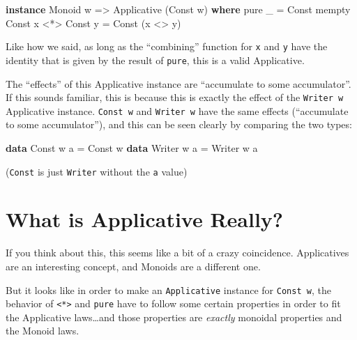 \documentclass[]{article}
\newenvironment{Shaded}{}{}
\newcommand{\DataTypeTok}[1]{\textcolor[rgb]{0.56,0.13,0.00}{#1}}
\newcommand{\FunctionTok}[1]{\textcolor[rgb]{0.02,0.16,0.49}{#1}}
\newcommand{\KeywordTok}[1]{\textcolor[rgb]{0.00,0.44,0.13}{\textbf{#1}}}
\newcommand{\NormalTok}[1]{#1}
\newcommand{\OperatorTok}[1]{\textcolor[rgb]{0.40,0.40,0.40}{#1}}
\newcommand{\OtherTok}[1]{\textcolor[rgb]{0.00,0.44,0.13}{#1}}
\begin{document}
\begin{Shaded}
\begin{Highlighting}[]
\KeywordTok{instance} \DataTypeTok{Monoid}\NormalTok{ w }\OtherTok{=\textgreater{}} \DataTypeTok{Applicative}\NormalTok{ (}\DataTypeTok{Const}\NormalTok{ w) }\KeywordTok{where}
    \FunctionTok{pure}\NormalTok{ \_              }\OtherTok{=} \DataTypeTok{Const} \FunctionTok{mempty}
    \DataTypeTok{Const}\NormalTok{ x }\OperatorTok{\textless{}*\textgreater{}} \DataTypeTok{Const}\NormalTok{ y }\OtherTok{=} \DataTypeTok{Const}\NormalTok{ (x }\OperatorTok{\textless{}\textgreater{}}\NormalTok{ y)}
\end{Highlighting}
\end{Shaded}

Like how we said, as long as the ``combining'' function for \texttt{x} and
\texttt{y} have the identity that is given by the result of \texttt{pure}, this
is a valid Applicative.

The ``effects'' of this Applicative instance are ``accumulate to some
accumulator''. If this sounds familiar, this is because this is exactly the
effect of the \texttt{Writer\ w} Applicative instance. \texttt{Const\ w} and
\texttt{Writer\ w} have the same effects (``accumulate to some accumulator''),
and this can be seen clearly by comparing the two types:

\begin{Shaded}
\begin{Highlighting}[]
\KeywordTok{data} \DataTypeTok{Const}\NormalTok{  w a }\OtherTok{=} \DataTypeTok{Const}\NormalTok{  w}
\KeywordTok{data} \DataTypeTok{Writer}\NormalTok{ w a }\OtherTok{=} \DataTypeTok{Writer}\NormalTok{ w a}
\end{Highlighting}
\end{Shaded}

(\texttt{Const} is just \texttt{Writer} without the \texttt{a} value)

\section{What is Applicative Really?}\label{what-is-applicative-really}

If you think about this, this seems like a bit of a crazy coincidence.
Applicatives are an interesting concept, and Monoids are a different one.

But it looks like in order to make an \texttt{Applicative} instance for
\texttt{Const\ w}, the behavior of \texttt{\textless{}*\textgreater{}} and
\texttt{pure} have to follow some certain properties in order to fit the
Applicative laws\ldots and those properties are \emph{exactly} monoidal
properties and the Monoid laws.
\end{document}
